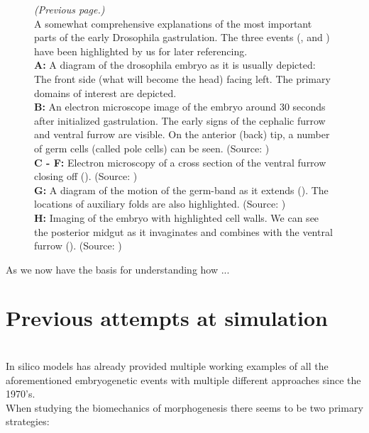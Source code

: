 \begin{figure} [t!]
  \caption{
      \textit{(Previous page.) }\\ 
      A somewhat comprehensive explanations of the most important parts of the early Drosophila gastrulation. The three events (,  and ) have been highlighted by us for later referencing.\\
      \textbf{A:} A diagram of the drosophila embryo as it is usually depicted: The front side (what will become the head) facing left. The primary domains of interest are depicted.\\
      \textbf{B:} An electron microscope image of the embryo around 30 seconds after initialized gastrulation. The early signs of the cephalic furrow and ventral furrow are visible. On the anterior (back) tip, a number of germ cells (called pole cells) can be seen. (Source: )\\
      \textbf{C - F:} Electron microscopy of a cross section of the {ventral furrow} closing off (). (Source: )\\
      \textbf{G:} A diagram of the motion of the {germ-band} as it extends (). The locations of auxiliary folds are also highlighted. (Source: )\\
      \textbf{H:} Imaging of the embryo with highlighted cell walls. We can see the {posterior midgut} as it invaginates and combines with the ventral furrow (). (Source: )
  }

\end{figure}

As we now have the basis for understanding how ...

\newpage
\section{Previous attempts at simulation}
\\
In silico models has already provided multiple working examples of all the aforementioned embryogenetic events with multiple different approaches since the 1970's.\\
When studying the biomechanics of morphogenesis there seems to be two primary strategies:\\

